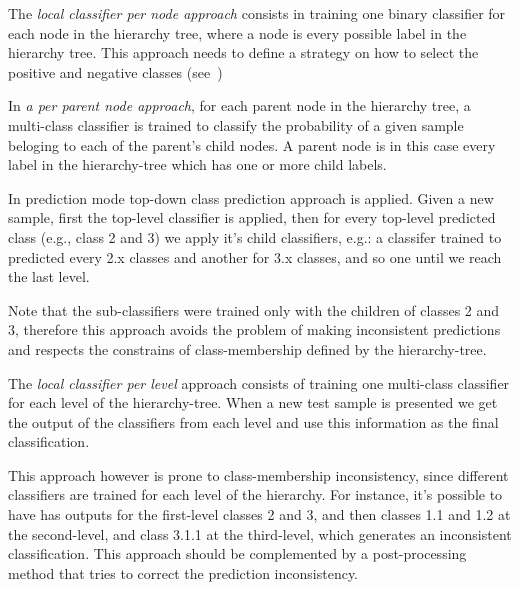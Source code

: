 \documentclass[11pt]{article}
\begin{document}
The \textit{local classifier per node approach} consists in training one binary classifier for each
node in the hierarchy tree, where a node is every possible label in the hierarchy tree. This
approach needs to define a strategy on how to select the positive and negative classes (see~\cite{})


In \textit{a per parent node approach}, for each parent node in the hierarchy tree, a multi-class
classifier is trained to classify the probability of a given sample beloging to each of the parent's
child nodes. A parent node is in this case every label in the hierarchy-tree which has one or more
child labels.

In prediction mode top-down class prediction approach is applied. Given a new sample, first the
top-level classifier is applied, then for every top-level predicted class (e.g., class 2 and 3)
we apply it's child classifiers, e.g.: a classifer trained to predicted every 2.x classes and
another for 3.x classes, and so one until we reach the last level.

Note that the sub-classifiers were trained only with the children of classes 2 and 3, therefore
this approach avoids the problem of making inconsistent predictions and respects the constrains
of class-membership defined by the hierarchy-tree.


The \textit{local classifier per level} approach consists of training one multi-class classifier
for each level of the hierarchy-tree. When a new test sample is presented we get the output of the
classifiers from each level and use this information as the final classification.

This approach however is prone to class-membership inconsistency, since different classifiers are
trained for each level of the hierarchy. For instance, it's possible to have has outputs for the
first-level classes 2 and 3, and then classes 1.1 and 1.2 at the second-level, and class 3.1.1
at the third-level, which generates an inconsistent classification. This approach should
be complemented by a post-processing method that tries to correct the prediction inconsistency.



\begin{comment}
In essence, in this top-down approach, for each new example in the test set, the system first
predicts its first-level (most generic) class, then it uses that predicted class to narrow
the choices of classes to be predicted at the second level (the only valid candidate
second-level classes are the children of the class predicted at the first level), and so on,
recursively, until the most specific prediction is made.

This local approach has some disadvantages, a disadvantage of the top-down class-prediction
approach (which is shared by all the three types of local classifiers discussed next) is that an
error at a certain class level is going to be propagated downwards the hierarchy, unless some
procedure for avoiding this problem is used
\end{comment}
\end{document}
